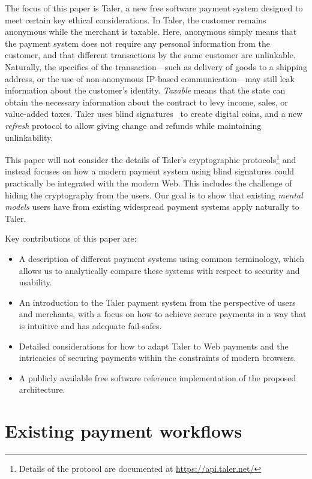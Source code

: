 \documentclass{IEEEtran}
\begin{document}
The focus of this paper is Taler, a new free software payment
system designed to meet certain key ethical considerations. In Taler,
the customer remains anonymous while the merchant is taxable.  Here,
anonymous simply means that the payment system does not require
any personal information from the customer, and that different
transactions by the same customer are unlinkable.  Naturally, the
specifics of the transaction---such as delivery of goods to a shipping
address, or the use of non-anonymous IP-based communication---may
still leak information about the customer's identity.  {\em Taxable}
means that the state can obtain the necessary information about the
contract to levy income, sales, or value-added taxes.  Taler uses blind
signatures~\cite{chaum1983blind} to create digital coins, and a new
{\em refresh} protocol to allow giving change and refunds while
maintaining unlinkability.

This paper will not consider the details of Taler's cryptographic
protocols\footnote{Details of the protocol are documented
at \url{https://api.taler.net/}} and instead focuses on how a modern
payment system using blind signatures could practically be integrated
with the modern Web.  This includes the challenge of hiding the
cryptography from the users.  Our goal is to show that existing {\em
mental models} users have from existing widespread payment systems
apply naturally to Taler.

Key contributions of this paper are:
\begin{itemize}
 \item A description of different payment systems using
  common terminology, which allows us to analytically compare
  these systems with respect to security and usability.
 \item An introduction to the Taler payment system from the
  perspective of users and merchants, with a focus on how
  to achieve secure payments in a way that is intuitive and
  has adequate fail-safes.
 \item Detailed considerations for how to adapt Taler to
  Web payments and the intricacies of securing payments
  within the constraints of modern browsers.
 \item A publicly available free software
  reference implementation of the proposed architecture.
\end{itemize}


\section{Existing payment workflows}
\end{document}
